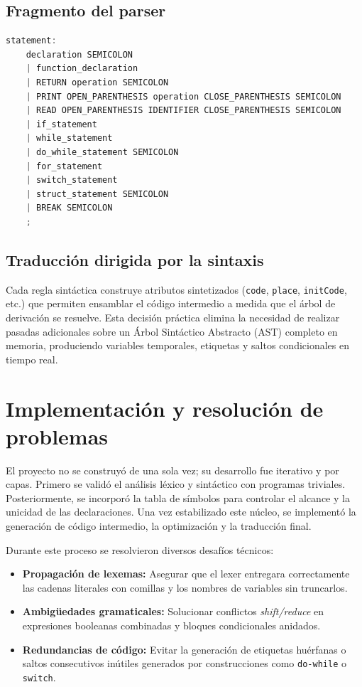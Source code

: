 \documentclass[12pt]{article}
\begin{document}
\subsection{Fragmento del parser}
\begin{lstlisting}[language=C, caption={Reglas principales de sentencias en Bison}]
statement:
    declaration SEMICOLON
    | function_declaration
    | RETURN operation SEMICOLON
    | PRINT OPEN_PARENTHESIS operation CLOSE_PARENTHESIS SEMICOLON
    | READ OPEN_PARENTHESIS IDENTIFIER CLOSE_PARENTHESIS SEMICOLON
    | if_statement
    | while_statement
    | do_while_statement SEMICOLON
    | for_statement
    | switch_statement
    | struct_statement SEMICOLON
    | BREAK SEMICOLON
    ;
\end{lstlisting}

\subsection{Traducción dirigida por la sintaxis}
Cada regla sintáctica construye atributos sintetizados (\texttt{code}, \texttt{place}, \texttt{initCode}, etc.) que permiten ensamblar el código intermedio a medida que el árbol de derivación se resuelve. Esta decisión práctica elimina la necesidad de realizar pasadas adicionales sobre un Árbol Sintáctico Abstracto (AST) completo en memoria, produciendo variables temporales, etiquetas y saltos condicionales en tiempo real.

\section{Implementación y resolución de problemas}
El proyecto no se construyó de una sola vez; su desarrollo fue iterativo y por capas. Primero se validó el análisis léxico y sintáctico con programas triviales. Posteriormente, se incorporó la tabla de símbolos para controlar el alcance y la unicidad de las declaraciones. Una vez estabilizado este núcleo, se implementó la generación de código intermedio, la optimización y la traducción final.

Durante este proceso se resolvieron diversos desafíos técnicos:
\begin{itemize}[label={-}]
    \item \textbf{Propagación de lexemas:} Asegurar que el lexer entregara correctamente las cadenas literales con comillas y los nombres de variables sin truncarlos.
    \item \textbf{Ambigüedades gramaticales:} Solucionar conflictos \textit{shift/reduce} en expresiones booleanas combinadas y bloques condicionales anidados.
    \item \textbf{Redundancias de código:} Evitar la generación de etiquetas huérfanas o saltos consecutivos inútiles generados por construcciones como \texttt{do-while} o \texttt{switch}.
\end{itemize}
\end{document}
